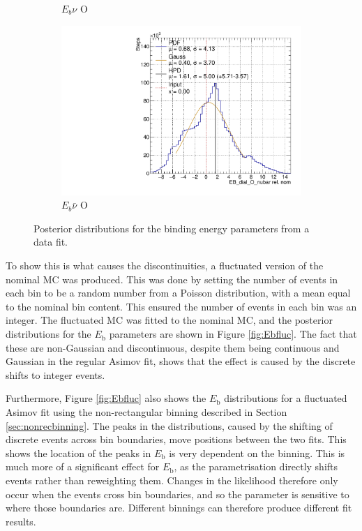 \begin{figure}
\begin{subfigure}{.48\textwidth}
  \caption{$E_{b}\nu$ O}
\end{subfigure}
\begin{subfigure}{.48\textwidth}
  \centering
  \includegraphics[width=0.73\linewidth]{figs/EB_dial_O_nubarData}
  \caption{$E_{b}\bar{\nu}$ O}
\end{subfigure}
\caption{Posterior distributions for the binding energy parameters from a data fit.}
\label{fig:Ebdata}
\end{figure}

To show this is what causes the discontinuities, a fluctuated version of the nominal MC was produced. This was done by setting the number of events in each bin to be a random number from a Poisson distribution, with a mean equal to the nominal bin content. This ensured the number of events in each bin was an integer. The fluctuated MC was fitted to the nominal MC, and the posterior distributions for the $E_{\mathrm{b}}$ parameters are shown in Figure \ref{fig:Ebfluc}. The fact that these are non-Gaussian and discontinuous, despite them being continuous and Gaussian in the regular Asimov fit, shows that the effect is caused by the discrete shifts to integer events.

Furthermore, Figure \ref{fig:Ebfluc} also shows the $E_\mathrm{b}$ distributions for a fluctuated Asimov fit using the non-rectangular binning described in Section \ref{sec:nonrecbinning}. The peaks in the distributions, caused by the shifting of discrete events across bin boundaries, move positions between the two fits. This shows the location of the peaks in $E_\mathrm{b}$ is very dependent on the binning. This is much more of a significant effect for $E_\mathrm{b}$, as the parametrisation directly shifts events rather than reweighting them. Changes in the likelihood therefore only occur when the events cross bin boundaries, and so the parameter is sensitive to where those boundaries are. Different binnings can therefore produce different fit results.


